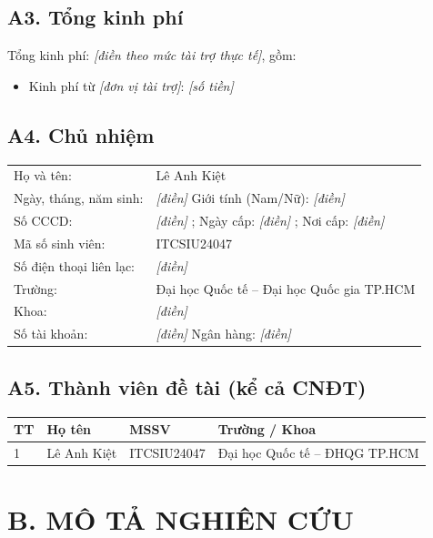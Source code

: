 \documentclass[a4paper,12pt]{article}
\begin{document}
\subsection*{A3. Tổng kinh phí}
Tổng kinh phí: \textit{[điền theo mức tài trợ thực tế]}, gồm:
\begin{itemize}[leftmargin=1.2em]
\item Kinh phí từ \textit{[đơn vị tài trợ]}: \textit{[số tiền]}
\end{itemize}

\subsection*{A4. Chủ nhiệm}
\begin{tabular}{@{}ll@{}}
Họ và tên: & Lê Anh Kiệt \\
Ngày, tháng, năm sinh: & \textit{[điền]} \hspace{1.5cm} Giới tính (Nam/Nữ): \textit{[điền]} \\
Số CCCD: & \textit{[điền]} \quad ; Ngày cấp: \textit{[điền]} ; Nơi cấp: \textit{[điền]} \\
Mã số sinh viên: & ITCSIU24047 \\
Số điện thoại liên lạc: & \textit{[điền]} \\
Trường: & Đại học Quốc tế -- Đại học Quốc gia TP.HCM \\
Khoa: & \textit{[điền]} \\
Số tài khoản: & \textit{[điền]} \hspace{1.5cm} Ngân hàng: \textit{[điền]} \\
\end{tabular}

\subsection*{A5. Thành viên đề tài (kể cả CNĐT)}
\begin{longtable}{@{}p{0.6cm} p{4.2cm} p{3cm} p{5cm}@{}}
\toprule
\textbf{TT} & \textbf{Họ tên} & \textbf{MSSV} & \textbf{Trường / Khoa} \\
\midrule
\endhead
1 & Lê Anh Kiệt & ITCSIU24047 & Đại học Quốc tế -- ĐHQG TP.HCM \\
\bottomrule
\end{longtable}

\newpage
\section*{B. MÔ TẢ NGHIÊN CỨU}
\end{document}
